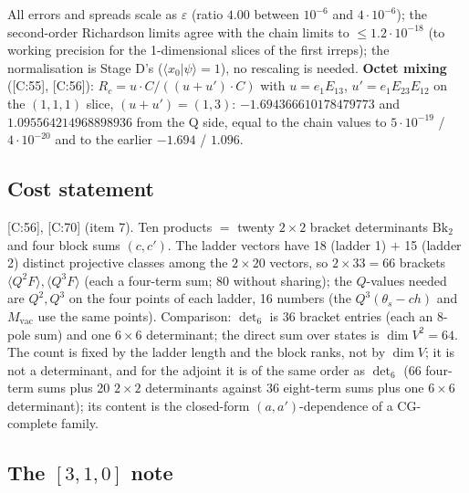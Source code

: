 \documentclass[10pt]{article}
\newcommand{\cl}[2]{\textsf{[#1:#2]}}
\newcommand{\Bk}{\mathrm{Bk}_2}
\newcommand{\vac}{\mathrm{vac}}
\begin{document}
All errors and spreads scale as $\varepsilon$ (ratio $4.00$ between $10^{-6}$ and $4\cdot10^{-6}$); the second-order Richardson limits agree with the chain limits to $\le1.2\cdot10^{-18}$ (to working precision for the 1-dimensional slices of the first irreps); the normalisation is Stage D's ($\langle x_0|\psi\rangle=1$), no rescaling is needed. \textbf{Octet mixing} (\cl{C}{55}, \cl{C}{56}): $R_c=u\cdot C/((u+u')\cdot C)$ with $u=e_1E_{13}$, $u'=e_1E_{23}E_{12}$ on the $(1,1,1)$ slice, $(u+u')=(1,3)$: $-1.694366610178479773$ and $1.095564214968898936$ from the Q side, equal to the chain values to $5\cdot10^{-19}$ / $4\cdot10^{-20}$ and to the earlier $-1.694$ / $1.096$.

\subsection{Cost statement}\label{sec:Ccost}

\cl{C}{56}, \cl{C}{70} (item 7). Ten products $=$ twenty $2\times2$ bracket determinants $\Bk$ and four block sums $(c,c')$. The ladder vectors have 18 (ladder 1) $+$ 15 (ladder 2) distinct projective classes among the $2\times20$ vectors, so $2\times33=66$ brackets $\langle Q^2F\rangle,\langle Q^3F\rangle$ (each a four-term sum; 80 without sharing); the $Q$-values needed are $Q^2,Q^3$ on the four points of each ladder, 16 numbers (the $Q^3(\theta_s-ch)$ and $M_\vac$ use the same points). Comparison: $\det_6$ is 36 bracket entries (each an 8-pole sum) and one $6\times6$ determinant; the direct sum over states is $\dim V^2=64$. The count is fixed by the ladder length and the block ranks, not by $\dim V$; it is not a determinant, and for the adjoint it is of the same order as $\det_6$ (66 four-term sums plus 20 $2\times2$ determinants against 36 eight-term sums plus one $6\times6$ determinant); its content is the closed-form $(a,a')$-dependence of a CG-complete family.

\subsection{The $[3,1,0]$ note}\label{sec:C310}
\end{document}
